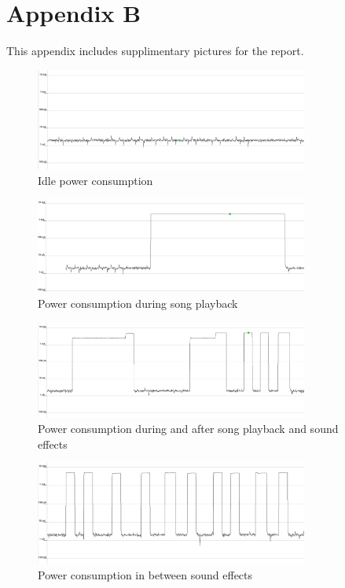 \section{Appendix B}
\label{appendix:b}

This appendix includes supplimentary pictures for the report.

\begin{figure}[ht!]
    \begin{center}
    \includegraphics[width=0.8\textwidth]{assets/img/idle.png}
    \caption{Idle power consumption}
    \label{fig:idle}
    \end{center}
\end{figure}

\begin{figure}[ht!]
    \begin{center}
    \includegraphics[width=0.8\textwidth]{assets/img/playback_song.png}
    \caption{Power consumption during song playback}
    \label{fig:playback_song}
    \end{center}
\end{figure}

\begin{figure}[ht!]
    \begin{center}
    \includegraphics[width=0.8\textwidth]{assets/img/song_and_sounds.png}
    \caption{Power consumption during and after song playback and sound effects}
    \label{fig:song_and_songs}
    \end{center}
\end{figure}

\begin{figure}[ht!]
    \begin{center}
    \includegraphics[width=0.8\textwidth]{assets/img/sounds.png}
    \caption{Power consumption in between sound effects}
    \label{fig:sounds}
    \end{center}
\end{figure}
